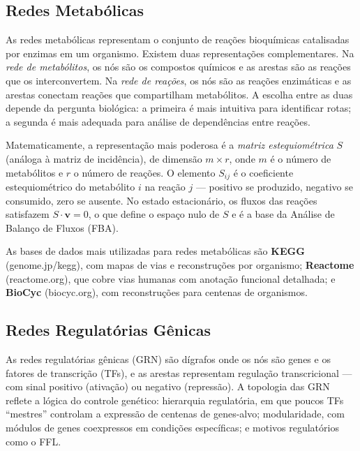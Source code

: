 \subsection{Redes Metabólicas}

As redes metabólicas representam o conjunto de reações bioquímicas catalisadas por enzimas
em um organismo. Existem duas representações complementares. Na \emph{rede de metabólitos},
os nós são os compostos químicos e as arestas são as reações que os interconvertem. Na
\emph{rede de reações}, os nós são as reações enzimáticas e as arestas conectam reações
que compartilham metabólitos. A escolha entre as duas depende da pergunta biológica: a
primeira é mais intuitiva para identificar rotas; a segunda é mais adequada para análise de
dependências entre reações.

Matematicamente, a representação mais poderosa é a \emph{matriz estequiométrica} $S$
(análoga à matriz de incidência), de dimensão $m \times r$, onde $m$ é o número de
metabólitos e $r$ o número de reações. O elemento $S_{ij}$ é o coeficiente estequiométrico
do metabólito $i$ na reação $j$ --- positivo se produzido, negativo se consumido, zero se
ausente. No estado estacionário, os fluxos das reações satisfazem $S \cdot \mathbf{v} = 0$,
o que define o espaço nulo de $S$ e é a base da Análise de Balanço de Fluxos (FBA).

As bases de dados mais utilizadas para redes metabólicas são \textbf{KEGG} (genome.jp/kegg),
com mapas de vias e reconstruções por organismo; \textbf{Reactome} (reactome.org),
que cobre vias humanas com anotação funcional detalhada; e \textbf{BioCyc} (biocyc.org),
com reconstruções para centenas de organismos.

\subsection{Redes Regulatórias Gênicas}

As redes regulatórias gênicas (GRN) são dígrafos onde os nós são genes e os fatores de
transcrição (TFs), e as arestas representam regulação transcricional --- com sinal positivo
(ativação) ou negativo (repressão). A topologia das GRN reflete a lógica do controle
genético: hierarquia regulatória, em que poucos TFs ``mestres'' controlam a expressão de
centenas de genes-alvo; modularidade, com módulos de genes coexpressos em condições
específicas; e motivos regulatórios como o FFL.

